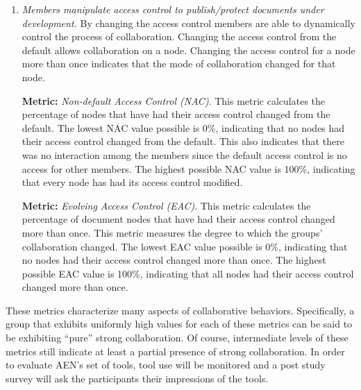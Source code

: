 \begin{enumerate}
  {\bf Metric:} {\em Feedback Node Creation (FNC)}.  This metric
  calculates the percentage of document nodes that have been commented
  on.  The lowest possible FNC value is 0\%, indicating that no document
  nodes were commented on.  The highest FNC value is 100\%, indicating that
  all document nodes were commented on.


\item{\em Members manipulate access control to publish/protect documents
  under development.}  By changing the access control members are able to
  dynamically control the process of collaboration.  Changing the access
  control from the default allows collaboration on a node.  Changing the
  access control for a node more than once indicates that the mode of
  collaboration changed for that node.

  {\bf Metric:} {\em Non-default Access Control (NAC)}.  This metric
  calculates the percentage of nodes that have had their access control
  changed from the default.  The lowest NAC value possible is 0\%, indicating
  that no nodes had their access control changed from the default.
  This also indicates that there was no interaction among the members
  since the default access control is no access for other members.  The
  highest possible NAC value is 100\%, indicating that every node has had its
  access control modified.

  {\bf Metric:} {\em Evolving Access Control (EAC)}.  This metric
  calculates the percentage of document nodes that have had their access
  control changed more than once. This metric measures the degree to
  which the groups' collaboration changed. The lowest EAC value possible
  is 0\%, indicating that no nodes had their access control changed more
  than once.  The highest possible EAC value is 100\%, indicating that
  all nodes had their access control changed more than once.

\end{enumerate}


These metrics characterize many aspects of collaborative behaviors.
Specifically, a group that exhibits uniformly high values for each of these
metrics can be said to be exhibiting ``pure'' strong collaboration.  Of
course, intermediate levels of these metrics still indicate at least a
partial presence of strong collaboration.  In order to evaluate
AEN's set of tools, tool use will be monitored and a post study survey will
ask the participants their impressions of the tools.



